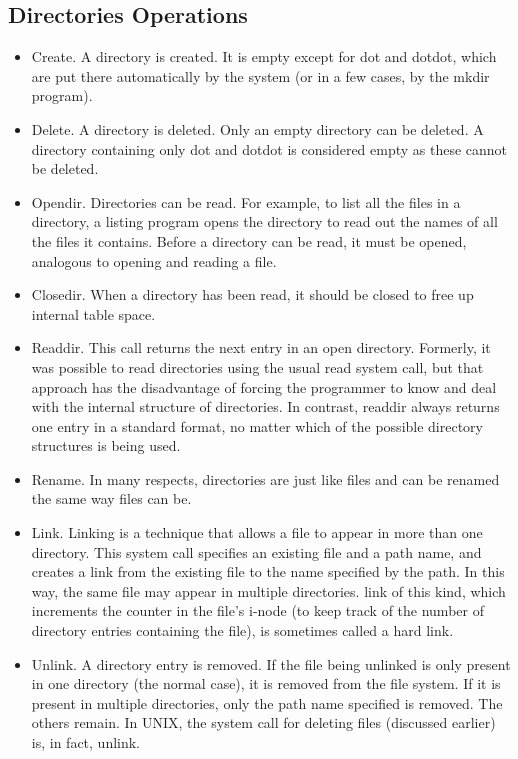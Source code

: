 

\subsection{Directories Operations}
\begin{itemize}
    \item Create. A directory is created. It is empty except for dot and dotdot,
    which are put there automatically by the system (or in a few cases, by
    the mkdir program).
    \item Delete. A directory is deleted. Only an empty directory can be deleted.
    A directory containing only dot and dotdot is considered empty
    as these cannot be deleted.
    \item Opendir. Directories can be read. For example, to list all the files in a
    directory, a listing program opens the directory to read out the names
    of all the files it contains. Before a directory can be read, it must be
    opened, analogous to opening and reading a file.
    \item Closedir. When a directory has been read, it should be closed to free
    up internal table space.
    \item Readdir. This call returns the next entry in an open directory. Formerly,
    it was possible to read directories using the usual read system
    call, but that approach has the disadvantage of forcing the programmer
    to know and deal with the internal structure of directories.
    In contrast, readdir always returns one entry in a standard format, no
    matter which of the possible directory structures is being used.
    \item Rename. In many respects, directories are just like files and can be
    renamed the same way files can be.
    \item Link. Linking is a technique that allows a file to appear in more than
    one directory. This system call specifies an existing file and a path
    name, and creates a link from the existing file to the name specified
    by the path. In this way, the same file may appear in multiple directories.
     link of this kind, which increments the counter in the file’s
    i-node (to keep track of the number of directory entries containing the
    file), is sometimes called a hard link.
    \item Unlink. A directory entry is removed. If the file being unlinked is
    only present in one directory (the normal case), it is removed from the
    file system. If it is present in multiple directories, only the path name
    specified is removed. The others remain. In UNIX, the system call
    for deleting files (discussed earlier) is, in fact, unlink.
\end{itemize}

